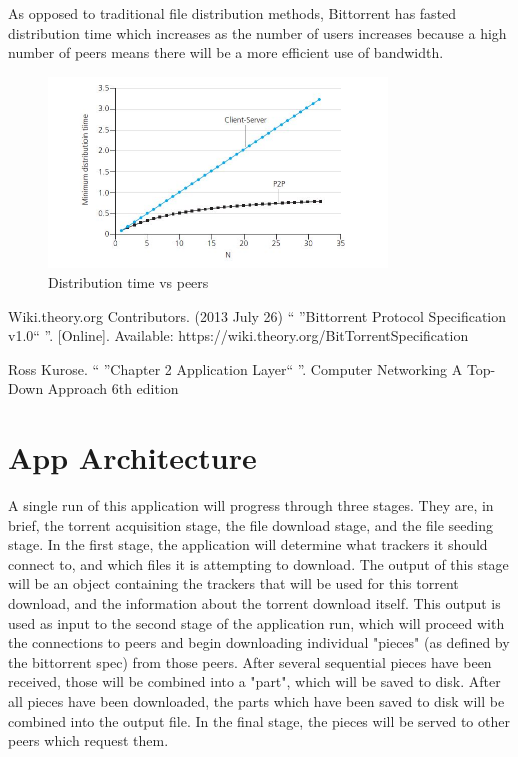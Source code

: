 \documentclass[letter]{scrartcl}
\begin{document}
As opposed to traditional file distribution methods, Bittorrent has fasted distribution time which increases as the number of users increases because a high number of peers means there  will be a more efficient use of bandwidth. 

\begin{figure}[ht!]
\centering
\includegraphics[width=90mm]{Graph.jpg}
\caption{Distribution time vs peers}
\label{overflow}
\end{figure}

Wiki.theory.org Contributors. (2013 July 26) `` ''Bittorrent Protocol Specification v1.0`` ''. [Online]. Available: https://wiki.theory.org/BitTorrentSpecification

Ross Kurose. `` ''Chapter 2 Application Layer`` ''. Computer Networking A Top-Down Approach 6th edition

\section{App Architecture}
A single run of this application will progress through three stages.  They are, in brief, the torrent acquisition stage, the file download stage, and the file seeding stage.  In the first stage, the application will determine what trackers it should connect to, and which files it is attempting to download.  The output of this stage will be an object containing the trackers that will be used for this torrent download, and the information about the torrent download itself.  This output is used as input to the second stage of the application run, which will proceed with the connections to peers and begin downloading individual "pieces" (as defined by the bittorrent spec) from those peers.  After several sequential pieces have been received, those will be combined into a "part", which will be saved to disk.  After all pieces have been downloaded, the parts which have been saved to disk will be combined into the output file.  In the final stage, the pieces will be served to other peers which request them.
\end{document}

